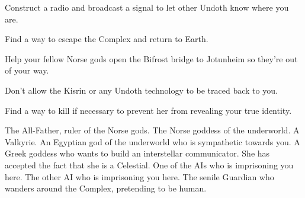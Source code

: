 \documentclass[char]{guardians}
\begin{document}
\begin{itemz}[Goals]
  \item Construct a radio and broadcast a signal to let other Undoth know where you are.
  \item Find a way to escape the Complex and return to Earth.
  \item Help your fellow Norse gods open the Bifrost bridge to Jotunheim so they're out of your way.
  \item Don't allow the Kisrin or any Undoth technology to be traced back to you.
  \item Find a way to kill \cAmaterasu{} if necessary to prevent her from revealing your true identity.
\end{itemz}

\begin{contacts}
  \contact{\cOdin{}} The All-Father, ruler of the Norse gods.
  \contact{\cHel{}} The Norse goddess of the underworld.
  \contact{\cVal{}} A Valkyrie.
  \contact{\cAnubis{}} An Egyptian god of the underworld who is sympathetic towards you.
  \contact{\cAthena{}} A Greek goddess who wants to build an interstellar communicator. She has accepted the fact that she is a Celestial.
   One of the AIs who is imprisoning you here.
   The other AI who is imprisoning you here.
  \contact{\cJascha{}} The senile Guardian who wanders around the Complex, pretending to be human.
\end{contacts}
\end{document}
